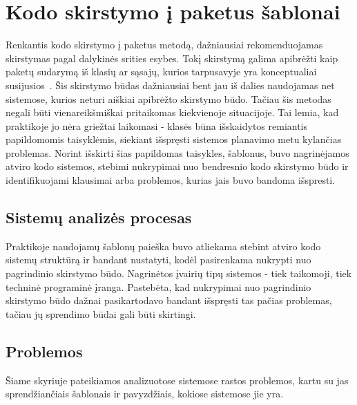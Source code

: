 \section{Kodo skirstymo į paketus šablonai}
Renkantis kodo skirstymo į paketus metodą, dažniausiai rekomenduojamas skirstymas pagal dalykinės srities esybes.
Tokį skirstymą galima apibrėžti kaip paketų sudarymą iš klasių ar sąsajų, kurios tarpusavyje yra konceptualiai susijusios~\cite{Functional}.
Šis skirstymo būdas dažniausiai bent jau iš dalies naudojamas net sistemose, kurios neturi aiškiai apibrėžto skirstymo būdo.
Tačiau šis metodas negali būti vienareikšmiškai pritaikomas kiekvienoje situacijoje.
Tai lemia, kad praktikoje jo nėra griežtai laikomasi - klasės būna išskaidytos remiantis papildomomis taisyklėmis,
siekiant išspręsti sistemos planavimo metu kylančias problemas.
Norint išskirti šias papildomas taisykles, šablonus, buvo nagrinėjamos atviro kodo sistemos,
stebimi nukrypimai nuo bendresnio kodo skirstymo būdo ir identifikuojami klausimai arba problemos, kurias jais buvo bandoma išspresti.

\subsection{Sistemų analizės procesas}
Praktikoje naudojamų šablonų paieška buvo atliekama stebint atviro kodo sistemų struktūrą ir bandant nustatyti, kodėl pasirenkama nukrypti
nuo pagrindinio skirstymo būdo.
Nagrinėtos įvairių tipų sistemos - tiek taikomoji, tiek techninė programinė įranga.
Pastebėta, kad nukrypimai nuo pagrindinio skirstymo būdo dažnai pasikartodavo bandant išspręsti tas pačias problemas,
tačiau jų sprendimo būdai gali būti skirtingi.

\subsection{Problemos}
Šiame skyriuje pateikiamos analizuotose sistemose rastos problemos, kartu su jas sprendžiančiais šablonais ir pavyzdžiais,
kokiose sistemose jie yra.


